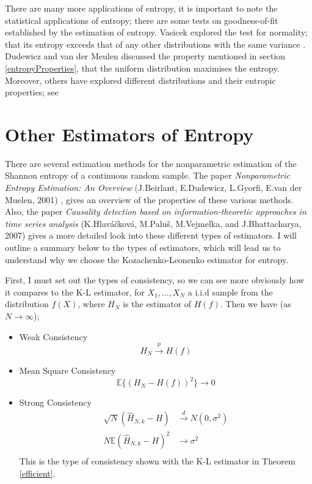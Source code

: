 \documentclass{report}
\begin{document}
There are many more applications of entropy, it is important to note the statistical applications of entropy; there are some tests on goodness-of-fit established by the estimation of entropy. Vasicek explored the test for normality; that its entropy exceeds that of any other distributions with the same variance \cite{stat1}. Dudewicz and van der Meulen \cite{stat2} discussed the property mentioned in section \ref{entropyProperties}, that the uniform distribution maximises the entropy. Moreover, others have explored different distributions and their entropic properties; see \cite{stat3, stat4}
 



\section{Other Estimators of Entropy} \label{otherest}

There are several estimation methods for the nonparametric estimation of the Shannon entropy of a continuous random sample. The paper \textit{Nonparametric Entropy Estimation: An Overview} (J.Beirlant, E.Dudewicz, L.Gyorfi, E.van der Muelen, 2001) \cite{paper10}, gives an overview of the properties of these various methods. Also, the paper \textit{Causality detection based on information-theoretic approaches in time series analysis} (K.Hlav\'{a}\v{c}kov\'{a}, M.Palu\v{s}, M.Vejmelka, and J.Bhattacharya, 2007) gives a more detailed look into these different types of estimators. I will outline a summary below to the types of estimators, which will lead us to understand why we choose the Kozachenko-Leonenko estimator for entropy. 

First, I must set out the types of consistency, so we can see more obviously how it compares to the K-L estimator, for $X_{1}, ..., X_{N}$ a i.i.d sample from the distribution $f(X)$, where $H_{N}$ is the estimator of $H(f)$. Then we have (as $N \to \infty$);
\begin{itemize}
\item Weak Consistency 
\begin{equation}
H_{N} \xrightarrow{p} H(f)
\end{equation}

\item Mean Square Consistency
\begin{equation}
\mathbb{E}\{(H_{N} - H(f))^2\} \to 0
\end{equation}

\item Strong Consistency
\begin{align}
\sqrt{N}(\hat{H}_{N, k} - H) &\xrightarrow{d} N(0, \sigma^2) \\
N \mathbb{E}{(\hat{H}_{N, k} - H)^2} &\xrightarrow{} \sigma^2 \\ \nonumber
\end{align}
This is the type of consistency shown with the K-L estimator in Theorem \ref{efficient}.

\end{itemize}
\end{document}
